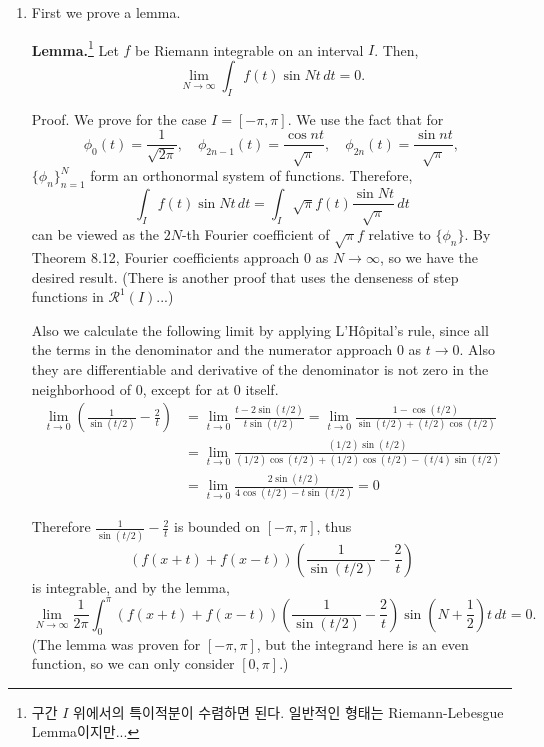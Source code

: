\documentclass[12pt]{report}
\newcommand{\num}[1]{\item[\textbf{\sffamily #1}]}
\newcommand{\ds}{\displaystyle}
\newcommand{\mc}[1]{\mathcal{#1}}
\newcommand{\paren}[1]{\left( #1 \right)}
\newcommand{\ra}{\rightarrow}
\renewcommand{\d}[1]{\,d{#1}}
\begin{document}
\begin{enumerate}
\begin{enumerate}
        \num{(b)} First we prove a lemma.
        \medskip

        {\sffamily \bfseries Lemma.}\footnote{구간 \(I\) 위에서의 특이적분이 수렴하면 된다. 일반적인 형태는 Riemann-Lebesgue Lemma이지만...} Let \(f\) be Riemann integrable on an interval \(I\). Then,
        \[
            \lim_{N \ra \infty} \int_I f(t) \sin Nt \d{t} = 0.
        \]

        \medskip

        {\sffamily Proof.} We prove for the case \(I = [-\pi, \pi]\). We use the fact that for
        \[
            \phi_0(t) = \frac{1}{\sqrt{2\pi}}, \quad \phi_{2n-1}(t) = \frac{\cos nt}{\sqrt{\pi}}, \quad \phi_{2n}(t) = \frac{\sin nt}{\sqrt{\pi}},
        \]
        \(\{\phi_n\}_{n=1}^N\) form an orthonormal system of functions. Therefore,
        \[
            \int_I f(t) \sin Nt \d{t} = \int_I \sqrt{\pi} f(t) \frac{\sin Nt}{\sqrt{\pi}} \d{t}
        \]
        can be viewed as the \(2N\)-th Fourier coefficient of \(\sqrt{\pi} f\) relative to \(\{\phi_n\}\). By Theorem 8.12, Fourier coefficients approach \(0\) as \(N \ra \infty\), so we have the desired result. (There is another proof that uses the denseness of step functions in \(\mc{R}^1(I)\)...)

        \medskip

        Also we calculate the following limit by applying L'H\^opital's rule, since all the terms in the denominator and the numerator approach \(0\) as \(t \ra 0\). Also they are differentiable and derivative of the denominator is not zero in the neighborhood of \(0\), except for at 0 itself.
        \[
            \begin{aligned}
                \lim_{t \ra 0} \paren{\frac{1}{\sin (t/2)} - \frac{2}{t}} & = \lim_{t \ra 0} \frac{t - 2\sin(t/2)}{t\sin(t/2)} = \lim_{t\ra 0}\frac{1 - \cos(t/2)}{\sin(t/2) + (t/2)\cos(t/2)} \\
                                                                          & = \lim_{t \ra 0} \frac{(1/2)\sin(t/2)}{(1/2)\cos(t/2) + (1/2)\cos(t/2) - (t/4)\sin(t/2)}                           \\
                                                                          & = \lim_{t \ra 0} \frac{2\sin(t/2)}{4\cos(t/2) - t\sin(t/2)} = 0
            \end{aligned}
        \]

        Therefore \(\ds \frac{1}{\sin(t/2)} - \frac{2}{t}\) is bounded on \([-\pi, \pi]\), thus
        \[
            \paren{f(x+t) + f(x-t)}\paren{\frac{1}{\sin (t/2)} - \frac{2}{t}}
        \]
        is integrable, and by the lemma,
        \[
            \lim_{N \ra \infty} \frac{1}{2\pi} \int_0^\pi \paren{f(x+t) + f(x-t)}\paren{\frac{1}{\sin (t/2)} - \frac{2}{t}} \sin \paren{N+\frac{1}{2}}t\d{t} = 0.
        \]
        (The lemma was proven for \([-\pi, \pi]\), but the integrand here is an even function, so we can only consider \([0, \pi]\).)


\end{enumerate}
\end{enumerate}
\end{document}
